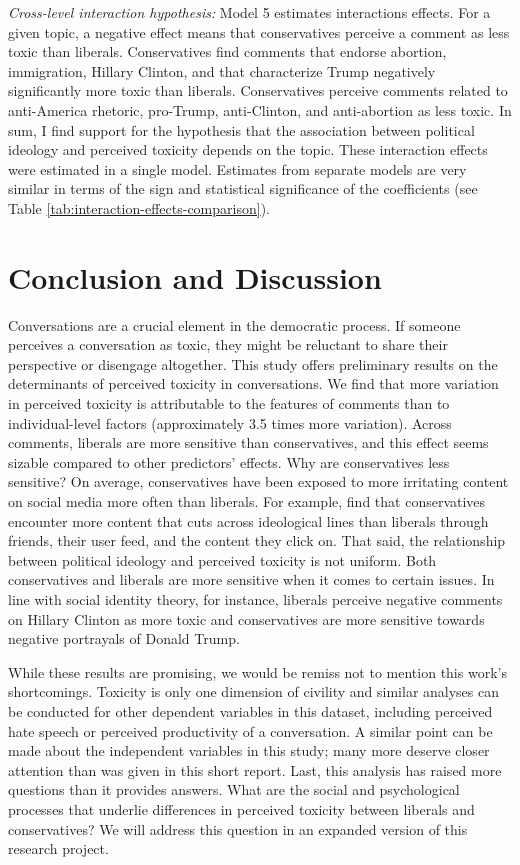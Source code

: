 \documentclass{article}
\begin{document}
\textit{Cross-level interaction hypothesis:} Model 5 estimates interactions effects. For a given topic, a negative effect means that conservatives perceive a comment as less toxic than liberals. Conservatives find comments that endorse abortion, immigration, Hillary Clinton, and that characterize Trump negatively significantly more toxic than liberals. Conservatives perceive comments related to anti-America rhetoric, pro-Trump, anti-Clinton, and anti-abortion as less toxic. In sum, I find support for the hypothesis that the association between political ideology and perceived toxicity depends on the topic. These interaction effects were estimated in a single model. Estimates from separate models are very similar in terms of the sign and statistical significance of the coefficients (see Table \ref{tab:interaction-effects-comparison}).

\section{Conclusion and Discussion}

Conversations are a crucial element in the democratic process. If someone perceives a conversation as toxic, they might be reluctant to share their perspective or disengage altogether. This study offers preliminary results on the determinants of perceived toxicity in conversations. We find that more variation in perceived toxicity is attributable to the features of comments than to individual-level factors (approximately 3.5 times more variation). Across comments, liberals are more sensitive than conservatives, and this effect seems sizable compared to other predictors' effects. Why are conservatives less sensitive? On average, conservatives have been exposed to more irritating content on social media more often than liberals. For example, \citet{bakshy_exposure_2015} find that conservatives encounter more content that cuts across ideological lines than liberals through friends, their user feed, and the content they click on. That said, the relationship between political ideology and perceived toxicity is not uniform. Both conservatives and liberals are more sensitive when it comes to certain issues. In line with social identity theory, for instance, liberals perceive negative comments on Hillary Clinton as more toxic and conservatives are more sensitive towards negative portrayals of Donald Trump. 

While these results are promising, we would be remiss not to mention this work's shortcomings. Toxicity is only one dimension of civility and similar analyses can be conducted for other dependent variables in this dataset, including perceived hate speech or perceived productivity of a conversation. A similar point can be made about the independent variables in this study; many more deserve closer attention than was given in this short report. Last, this analysis has raised more questions than it provides answers. What are the social and psychological processes that underlie differences in perceived toxicity between liberals and conservatives? We will address this question in an expanded version of this research project. 
\end{document}
